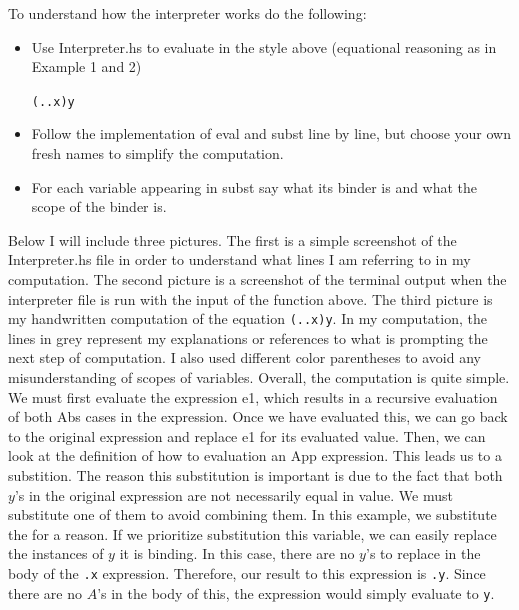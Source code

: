 \documentclass{article}
\theoremstyle{theorem}
\theoremstyle{definition}
\theoremstyle{remark}
\begin{document}
To understand how the interpreter works do the following:
\begin{itemize}
  \item[\ding{99}] Use Interpreter.hs to evaluate in the style above (equational reasoning as in Example 1 and 2)  
  \begin{center}\texttt{(\x.\y.x)y}\end{center} 
  \item[\ding{99}]Follow the implementation of eval and subst line by line, but choose your own fresh names to simplify the computation.
  \item[\ding{99}] For each variable appearing in subst say what its binder is and what the scope of the binder is.
\end{itemize}

Below I will include three pictures. The first is a simple screenshot of the Interpreter.hs file in order to understand what lines I am referring to in my computation. The second picture is a screenshot of the terminal output when the interpreter file is run with the input of the function above. 
The third picture is my handwritten computation of the equation \texttt{(\x.\y.x)y}. 
In my computation, the lines in grey represent my explanations or references to what is prompting the next step of computation. I also used different color parentheses to avoid any misunderstanding of scopes of variables. Overall, the computation is quite simple. 
We must first evaluate the expression e1, which results in a recursive evaluation of both Abs cases in the expression. Once we have evaluated this, we can go back to the original expression and replace e1 for its evaluated value. Then, we can look at the definition of 
how to evaluation an App expression. This leads us to a substition. The reason this substitution is important is due to the fact that both $y$'s in the original expression are not necessarily equal in value. We must substitute one of them to avoid combining them. In this example, 
we substitute the \texttt{\y} for a reason. If we prioritize substitution this variable, we can easily replace the instances of $y$ it is binding. In this case, there are no $y$'s to replace in the body of the \texttt{\y.x} expression. Therefore, our 
result to this expression is \texttt{\A.y}. Since there are no $A$'s in the body of this, the expression would simply evaluate to \texttt{y}.
\end{document}
